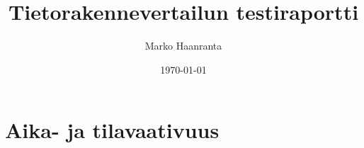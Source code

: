 \documentclass[11pt,a4paper]{article}
\author{Marko Haanranta}
\date{\today}
\title{Tietorakennevertailun testiraportti}
\begin{document}
\maketitle


\section{Aika- ja tilavaativuus}
\end{document}
